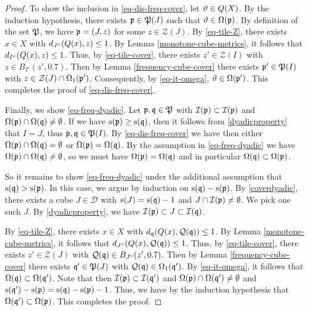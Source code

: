 {\begin{proof}
    To show the inclusion in \eqref{eq-dis-freq-cover}, let ${\vartheta} \in {Q}(X)$. By the induction hypothesis, there exists ${\mathfrak p} \in {\mathfrak P}(J)$ such that ${\vartheta} \in \Omega({\mathfrak p})$. By definition of the set ${\mathfrak P}$, we have ${\mathfrak p} = (J, z)$ for some $z \in \mathcal{Z}(J)$. By \eqref{eq-tile-Z}, there exists $x \in X$ with $d_{J^\circ}({Q}(x), z) \le 1$. By Lemma \ref{monotone-cube-metrics}, it follows that $d_{I^\circ}({Q}(x), z) \le 1$.
    Thus, by \eqref{eq-tile-cover}, there exists $z' \in \mathcal{Z}(I)$ with $z \in B_{I^\circ}(z', 0.7)$. Then by Lemma \eqref{frequency-cube-cover} there exists ${\mathfrak p}' \in {\mathfrak P}(I)$ with $z \in \mathcal{Z}(J) \cap \Omega_1({\mathfrak p}')$. Consequently, by \eqref{eq-it-omega}, ${\vartheta} \in {\Omega}({\mathfrak p}')$. This completes the proof of \eqref{eq-dis-freq-cover}.

    Finally, we show \eqref{eq-freq-dyadic}. Let ${\mathfrak p}, {\mathfrak q} \in {\mathfrak P}$ with ${\mathcal{I}}({\mathfrak p}) \subset {\mathcal{I}}({\mathfrak p})$ and ${\Omega}({\mathfrak p}) \cap {\Omega}({\mathfrak q}) \ne \emptyset$. If we have ${\mathrm{s}}({\mathfrak p}) \ge {\mathrm{s}}({\mathfrak q})$, then it follows from \eqref{dyadicproperty} that $I = J$, thus ${\mathfrak p}, {\mathfrak q} \in {\mathfrak P}(I)$. By \eqref{eq-dis-freq-cover} we have then either ${\Omega}({\mathfrak p}) \cap {\Omega}({\mathfrak q}) = \emptyset$ or ${\Omega}({\mathfrak p}) = {\Omega}({\mathfrak q})$. By the assumption in \eqref{eq-freq-dyadic} we have ${\Omega}({\mathfrak p}) \cap {\Omega}({\mathfrak q}) \ne \emptyset$, so we must have ${\Omega}({\mathfrak p}) = {\Omega}({\mathfrak q})$ and in particular ${\Omega}({\mathfrak q}) \subset {\Omega}({\mathfrak p})$.

    So it remains to show \eqref{eq-freq-dyadic} under the additional assumption that ${\mathrm{s}}({\mathfrak q}) > {\mathrm{s}}({\mathfrak p})$. In this case, we argue by induction on ${\mathrm{s}}({\mathfrak q})-{\mathrm{s}}({\mathfrak p})$. By \eqref{coverdyadic}, there exists a cube $J \in \mathcal{D}$ with $s(J) = {\mathrm{s}}({\mathfrak q}) - 1$ and $J \cap{\mathcal{I}}({\mathfrak p}) \ne \emptyset$. We pick one such $J$. By \eqref{dyadicproperty}, we have ${\mathcal{I}}({\mathfrak p}) \subset J \subset {\mathcal{I}}({\mathfrak q})$.

    By \eqref{eq-tile-Z}, there exists $x \in X$ with $d_{{\mathfrak q}}({Q}(x), {\mathcal{Q}}({\mathfrak q})) \le 1$. By Lemma \ref{monotone-cube-metrics}, it follows that $d_{J^\circ}({Q}(x), {\mathcal{Q}}({\mathfrak q})) \le 1$.
    Thus, by \eqref{eq-tile-cover}, there exists $z' \in \mathcal{Z}(J)$ with ${\mathcal{Q}}({\mathfrak q}) \in B_{J^\circ}(z', 0.7)$. Then by Lemma \ref{frequency-cube-cover} there exists ${\mathfrak q}' \in {\mathfrak P}(J)$ with ${\mathcal{Q}}({\mathfrak q}) \in\Omega_1({\mathfrak q}')$.
    By \eqref{eq-it-omega}, it follows that $\Omega({\mathfrak q}) \subset \Omega({\mathfrak q}')$. Note that then ${\mathcal{I}}({\mathfrak p}) \subset {\mathcal{I}}({\mathfrak q}')$ and ${\Omega}({\mathfrak p}) \cap {\Omega}({\mathfrak q}') \ne \emptyset$ and ${\mathrm{s}}({\mathfrak q}') - {\mathrm{s}}({\mathfrak p}) = {\mathrm{s}}({\mathfrak q}) - {\mathrm{s}}({\mathfrak p}) - 1$. Thus, we have by the induction hypothesis that $\Omega({\mathfrak q}') \subset \Omega({\mathfrak p})$. This completes the proof.
\end{proof}

}
